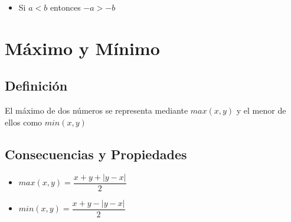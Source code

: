 \documentclass[12pt, fleqn]{report}                             %
\newenvironment{SmallIndentation}[1][0.75em]                    %
        {\begin{adjustwidth}{#1}{}\begin{footnotesize}}             %
        {\end{footnotesize}\end{adjustwidth}}                       %
\theoremstyle{break}                                            %
\begin{document}
\begin{itemize}
\begin{SmallIndentation}[1em]
                            Por lo tanto hemos demostrado que si $a>0$ y $b>0$ y $a<b$ entonces $b^{-1}<a^{-1}$                                
                        \end{SmallIndentation}

                    \item Si $a < b$ entonces $-a > -b$
                            
                \end{itemize}


        \clearpage
        \section{Máximo y Mínimo}

            \subsection{Definición}

                El máximo de dos números se representa mediante $max(x, y)$ y el menor de 
                ellos como $min(x, y)$

            \vspace{1em}
            \subsection{Consecuencias y Propiedades}

                \begin{itemize}
                    \item $max(x, y) = \dfrac{x+y + |y-x|}{2}$
                    \item $min(x, y) = \dfrac{x+y - |y-x|}{2}$
                \end{itemize}


        \clearpage
\end{document}
